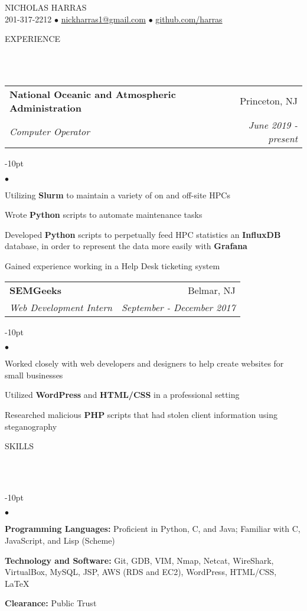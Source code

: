 \documentclass[12pt]{article}
\makeatletter
\newcommand{\mailto}[1]{
	\href{mailto:#1}{#1}
}
\newcommand{\contact}[2]{
	\vspace*{-8pt}
	\begin{center}
		{#1}\\ %
		#2
	\end{center}
	\vspace*{-12pt}
}
\newcommand{\header}[1]{
	\vspace*{12pt} %
	{\hspace*{-14pt}\vspace*{6pt} #1}
	\vspace*{-6pt} 
	\lineunder
}
\newcommand{\lineunder}{
	\vspace*{-8pt} \\ 
	\hspace*{-18pt} 
	\hrulefill \\
}
\newcommand{\subheading}[4]{
 	\vspace{5pt}
    	\begin{tabular*}{1.01\textwidth}
    		{l@{\extracolsep{\fill}}r}
      		\hspace{-16pt}\textbf{#1} & #2 \\
      		\hspace{-16pt}\textit{\small#3} & \textit{\small #4} \\
    	\end{tabular*}
    \vspace{-4pt}
}
\newenvironment{achievements}{
\begin{adjustwidth}{-10pt}{}
  \begin{list}{$\bullet$}{
  	\topsep 0pt \itemsep -4pt}}
  	{\vspace*{2pt}\end{list}
\end{adjustwidth}
}
\def\cpp{
	{\hspace{-0.25em}C\nolinebreak[4]\hspace{-.05em}\raisebox{.4ex}{\tiny		\bf ++}}}
\makeatother
\begin{document}
\small
\smallskip
\vspace*{-40pt}

\contact{\huge{N}\LARGE{ICHOLAS} \huge{H}\LARGE{ARRAS}}{201-317-2212 $\bullet$ \mailto{nickharras1@gmail.com} $\bullet$ \href{https://www.github.com/harras}{github.com/harras}}


\header{EXPERIENCE}

\subheading
	{National Oceanic and Atmospheric Administration}{Princeton, NJ}
	{Computer Operator}{June 2019 - present}
	\begin{achievements}
		\item Utilizing \textbf{Slurm} to maintain a variety of on and off-site HPCs
		\item Wrote \textbf{Python} scripts to automate maintenance tasks
		\item Developed \textbf{Python} scripts to perpetually feed HPC statistics an \textbf{InfluxDB} database, in order to represent the data more easily with \textbf{Grafana}
		\item Gained experience working in a Help Desk ticketing system
	\end{achievements}
	
\subheading
	{SEMGeeks}{Belmar, NJ}
	{Web Development Intern}{September - December 2017}
	\begin{achievements}
		\item Worked closely with web developers and designers to help create websites for small businesses
		\item Utilized \textbf{WordPress} and \textbf{HTML/CSS} in a professional setting
		\item Researched malicious \textbf{PHP} scripts that had stolen client information using steganography
	\end{achievements}

	
\header{SKILLS}
	\begin{achievements}
		\item{\bf Programming Languages:} Proficient in Python, C, and Java; Familiar with \cpp, JavaScript, and Lisp (Scheme)
		\item{\bf Technology and Software:} Git, GDB, VIM, Nmap, Netcat, WireShark, VirtualBox, MySQL, JSP, AWS (RDS and EC2), WordPress, HTML/CSS, \LaTeX
		\item{\bf Clearance:} Public Trust
	\end{achievements}
\end{document}
